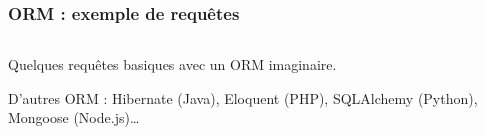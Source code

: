     \begin{frame}
        \frametitle{ORM : exemple de requêtes}

        \begin{listing}[H]
            \inputminted[fontsize=\tiny, linenos=true]{java}{code/eloquent.java}
            \caption{Quelques requêtes basiques avec un ORM imaginaire.}
        \end{listing}

        \scriptsize{D'autres ORM : Hibernate (Java), Eloquent (PHP), SQLAlchemy (Python), Mongoose (Node.js)\dots}
    \end{frame}
